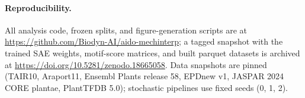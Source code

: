 \documentclass{article}
\begin{document}
\paragraph{Reproducibility.}
All analysis code, frozen splits, and figure-generation scripts are at
\url{https://github.com/Biodyn-AI/aido-mechinterp}; a tagged snapshot
with the trained SAE weights, motif-score matrices, and built parquet
datasets is archived at
\url{https://doi.org/10.5281/zenodo.18665058}.
Data snapshots are pinned (TAIR10, Araport11, Ensembl Plants release 58,
EPDnew v1, JASPAR 2024 CORE plantae, PlantTFDB 5.0); stochastic pipelines
use fixed seeds (0, 1, 2).



\end{document}
